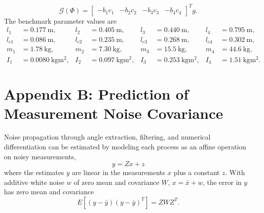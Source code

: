 \documentclass[11pt]{article}
\begin{document}
\[
\mathcal{G}(\Phi) = \begin{bmatrix}-b_1c_1 & -b_2c_2 & -b_3c_3 & -b_4c_4
\end{bmatrix}^T g.
\]
The benchmark parameter values are
\[
\begin{aligned}
l_1 &= \SI{0.177}{\metre}, & l_2 &= \SI{0.405}{\metre}, &
l_3 &= \SI{0.440}{\metre}, & l_4 &= \SI{0.795}{\metre},\\
l_{c1} &= \SI{0.086}{\metre}, & l_{c2} &= \SI{0.235}{\metre}, &
l_{c3} &= \SI{0.268}{\metre}, & l_{c4} &= \SI{0.302}{\metre},\\
m_1 &= \SI{1.78}{\kilogram}, & m_2 &= \SI{7.30}{\kilogram}, &
m_3 &= \SI{15.5}{\kilogram}, & m_4 &= \SI{44.6}{\kilogram},\\
I_1 &= \SI{0.0080}{\kilogram\metre\squared}, &
I_2 &= \SI{0.097}{\kilogram\metre\squared}, &
I_3 &= \SI{0.253}{\kilogram\metre\squared}, &
I_4 &= \SI{1.51}{\kilogram\metre\squared}.
\end{aligned}
\]

\section*{Appendix B: Prediction of Measurement Noise Covariance}
\setcounter{equation}{0}
\renewcommand{\theequation}{B\arabic{equation}}

Noise propagation through angle extraction, filtering, and numerical
differentiation can be estimated by modeling each process as an affine
operation on noisy measurements,
\begin{equation}
y = Zx + z
\label{eq:B1}
\end{equation}
where the estimates $y$ are linear in the measurements $x$ plus a constant
$z$. With additive white noise $w$ of zero mean and covariance $W$,
$x=\bar{x}+w$, the error in $y$ has zero mean and covariance
\begin{equation}
E[(y-\bar{y})(y-\bar{y})^T] = ZWZ^T.
\label{eq:B2}
\end{equation}
\end{document}
